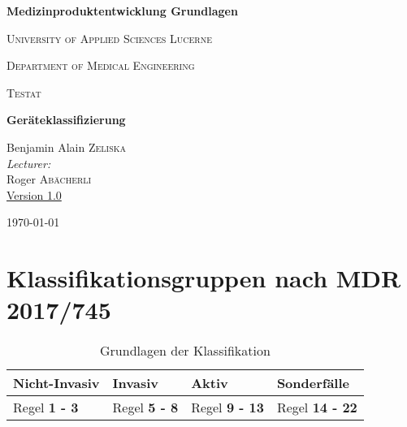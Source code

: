 \documentclass[fontsize=11pt,a4paper] {article}
\begin{document}
	
	
	\begin{titlepage}
		\centering
		
		\vspace{2cm}
		
		{\huge \bfseries Medizinproduktentwicklung Grundlagen\par}
		
		\vspace{1cm}
		
		{\LARGE\scshape University of Applied Sciences Lucerne\par}
		
		\vspace{1cm}
		
		
		{\large\scshape Department of Medical Engineering}
		
		\vspace{2cm}
		
		{\Large\scshape Testat \par}
		
		{\Large \bfseries Geräteklassifizierung \par}
		
		\vspace{2.5cm}
		
		Benjamin Alain \textsc{Zeliska}\\[1.5cm]

		
		
		
		\emph{Lecturer:} \\ [0.3cm]
		{Roger  \textsc{Abächerli} }\\[4cm]
		
		\href{https://github.com/}{Version 1.0} 
		\vfill
		
		{\large \today\par}
	\end{titlepage}
	\tableofcontents
	\newpage
	
	\section{Klassifikationsgruppen nach MDR 2017/745}
	
	 \begin{table}[H]
	 	\caption[Grundlagen nach MDR 2017/745]{Grundlagen der Klassifikation} 
	 	\begin{tabular}{||m{4cm}|m{4cm}|m{4cm}|m{4cm}|} \hline
	 		\textbf{Nicht-Invasiv}	& \textbf{Invasiv} & \textbf{Aktiv} & \textbf{Sonderfälle} 
	 		\\\hline
	 		Regel \textbf{1 - 3} & Regel \textbf{5 - 8} & Regel \textbf{9 - 13} & Regel \textbf{14 - 22} \\\hline
	 	
	 	\end{tabular}
	 \end{table}
\end{document}
